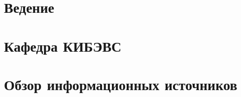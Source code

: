 


 
 
%  
 
 \newpage
 \tableofcontents

% 


\titleformat{\section}{\centering\normalfont\normalsize}{\thesection}{1.0em}{}
\titleformat{\subsection}{\centering\normalfont\normalsize}{\thesubsection}{1.0em}{}
\titleformat{\subsubsection}{\centering\normalfont\normalsize}{\thesubsection}{1.0em}{}


\newpage
{}
\setcounter{section}{0}
\section*{Ведение}


\section{Кафедра КИБЭВС}



\newpage 
\section{Обзор информационных источников }


\newpage
